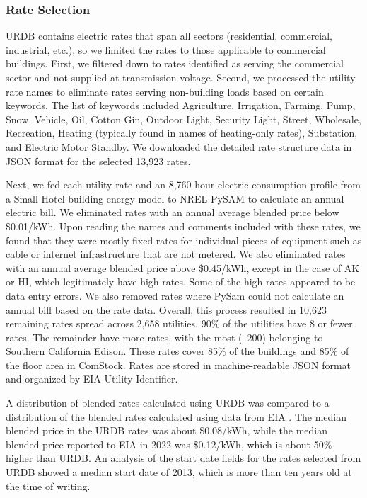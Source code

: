 \subsubsection{Rate Selection}
URDB contains electric rates that span all sectors (residential, commercial, industrial, etc.), so we limited the rates to those applicable to commercial buildings. First, we filtered down to rates identified as serving the commercial sector and not supplied at transmission voltage. Second, we processed the utility rate names to eliminate rates serving non-building loads based on certain keywords. The list of keywords included Agriculture, Irrigation, Farming, Pump, Snow, Vehicle, Oil, Cotton Gin, Outdoor Light, Security Light, Street, Wholesale, Recreation, Heating (typically found in names of heating-only rates), Substation, and Electric Motor Standby. We downloaded the detailed rate structure data in JSON format for the selected 13,923 rates.

Next, we fed each utility rate and an 8,760-hour electric consumption profile from a Small Hotel building energy model to NREL PySAM \citep{pysam} to calculate an annual electric bill. We eliminated rates with an annual average blended price below \$0.01/kWh. Upon reading the names and comments included with these rates, we found that they were mostly fixed rates for individual pieces of equipment such as cable or internet infrastructure that are not metered. We also eliminated rates with an annual average blended price above \$0.45/kWh, except in the case of AK or HI, which legitimately have high rates. Some of the high rates appeared to be data entry errors. We also removed rates where PySam could not calculate an annual bill based on the rate data. Overall, this process resulted in 10,623 remaining rates spread across 2,658 utilities. 90\% of the utilities have 8 or fewer rates. The remainder have more rates, with the most (~200) belonging to Southern California Edison. These rates cover 85\% of the buildings and 85\% of the floor area in ComStock. Rates are stored in machine-readable JSON format and organized by EIA Utility Identifier.

A distribution of blended rates calculated using URDB was compared to a distribution of the blended rates calculated using data from EIA \citep{eia_electricity}. The median blended price in the URDB rates was about \$0.08/kWh, while the median blended price reported to EIA in 2022 was \$0.12/kWh, which is about 50\% higher than URDB. An analysis of the start date fields for the rates selected from URDB showed a median start date of 2013, which is more than ten years old at the time of writing.

